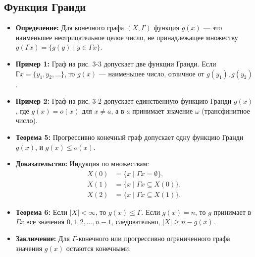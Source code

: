 \subsection{Функция Гранди}

\begin{itemize}
    \item \textbf{Определение:} Для конечного графа $(X, \Gamma)$ функция $g(x)$ — это наименьшее неотрицательное целое число, не принадлежащее множеству $g(\Gamma x) = \{g(y) \mid y \in \Gamma x\}$.
    \item \textbf{Пример 1:} Граф на рис. 3-3 допускает две функции Гранди. Если $Гx = \{y_1, y_2, \ldots\}$, то $g(x)$ — наименьшее число, отличное от $g(y_1), g(y_2)$.
    \item \textbf{Пример 2:} Граф на рис. 3-2 допускает единственную функцию Гранди $g(x)$, где $g(x) = o(x)$ для $x \neq a$, а в $a$ принимает значение $\omega$ (трансфинитное число).
    \item \textbf{Теорема 5:} Прогрессивно конечный граф допускает одну функцию Гранди $g(x)$, и $g(x) \leq o(x)$.
    \item \textbf{Доказательство:} Индукция по множествам:
    \begin{align*}
        X(0) &= \{x \mid \varGamma x = \emptyset\}, \\
        X(1) &= \{x \mid \varGamma x \subseteq X(0)\}, \\
        X(2) &= \{x \mid \varGamma x \subseteq X(1)\}.
    \end{align*}
    \item \textbf{Теорема 6:} Если $|X| < \infty$, то $g(x) \leq \Gamma$. Если $g(x) = n$, то $g$ принимает в $\varGamma x$ все значения $0, 1, 2, \ldots, n-1$, следовательно, $|X| \geq n - g(x)$.
    \item \textbf{Заключение:} Для $\Gamma$-конечного или прогрессивно ограниченного графа значения $g(x)$ остаются конечными.
\end{itemize}